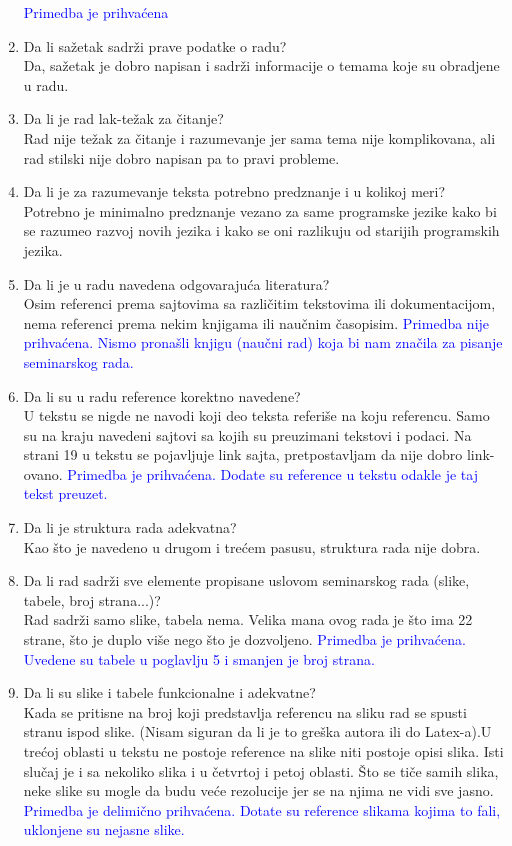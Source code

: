 \documentclass[a4paper]{report}
\newcommand{\odgovor}[1]{\textcolor{blue}{#1}}
\begin{document}
\begin{enumerate}
\odgovor{Primedba je prihvaćena}
\item Da li sažetak sadrži prave podatke o radu?\\
Da, sažetak je dobro napisan i sadrži informacije o temama koje su obradjene u radu.
\item Da li je rad lak-težak za čitanje?\\
Rad nije težak za čitanje i razumevanje jer sama tema nije komplikovana, ali rad stilski nije dobro napisan pa to pravi probleme.
\item Da li je za razumevanje teksta potrebno predznanje i u kolikoj meri?\\
Potrebno je minimalno predznanje vezano za same programske jezike kako bi se razumeo razvoj novih jezika i kako se oni razlikuju od starijih programskih jezika.
\item Da li je u radu navedena odgovarajuća literatura?\\
Osim referenci prema sajtovima sa različitim tekstovima ili dokumentacijom, nema referenci prema nekim knjigama ili naučnim časopisim.
\odgovor{Primedba nije prihvaćena. Nismo pronašli knjigu (naučni rad) koja bi nam značila za pisanje seminarskog rada.}
\item Da li su u radu reference korektno navedene?\\
U tekstu se nigde ne navodi koji deo teksta referiše na koju referencu. Samo su na kraju navedeni sajtovi sa kojih su preuzimani tekstovi i podaci. Na strani 19 u tekstu se pojavljuje link sajta, pretpostavljam da nije dobro link-ovano.
\odgovor{Primedba je prihvaćena. Dodate su reference u tekstu odakle je taj tekst preuzet.}
\item Da li je struktura rada adekvatna?\\
Kao što je navedeno u drugom i trećem pasusu, struktura rada nije dobra.
\item Da li rad sadrži sve elemente propisane uslovom seminarskog rada (slike, tabele, broj strana...)?\\
Rad sadrži samo slike, tabela nema. Velika mana ovog rada je što ima 22 strane, što je duplo više nego što je dozvoljeno.
\odgovor{Primedba je prihvaćena. Uvedene su tabele u poglavlju 5 i smanjen je broj strana.}
\item Da li su slike i tabele funkcionalne i adekvatne?\\
Kada se pritisne na broj koji predstavlja referencu na sliku rad se spusti stranu ispod slike. (Nisam siguran da li je to greška autora ili do Latex-a).U trećoj oblasti u tekstu ne postoje reference na slike niti postoje opisi slika. Isti slučaj je i sa nekoliko slika i u četvrtoj i petoj oblasti. Što se tiče samih slika, neke slike su mogle da budu veće rezolucije jer se na njima ne vidi sve jasno.
\odgovor{Primedba je delimično prihvaćena. Dotate su reference slikama kojima to fali, uklonjene su nejasne slike.}
\end{enumerate}
\end{document}
